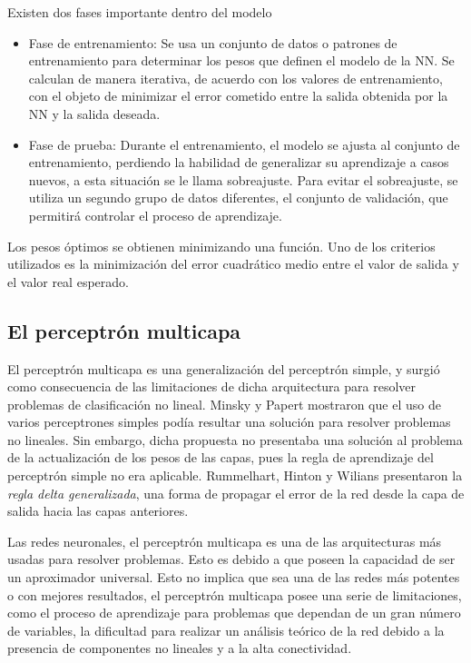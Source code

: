 Existen dos fases importante dentro del modelo
\begin{itemize}
	\item Fase de entrenamiento: Se usa un conjunto de datos o patrones de entrenamiento para determinar los pesos que definen el modelo de la NN. Se calculan de manera iterativa, de acuerdo con los valores de entrenamiento, con el objeto de minimizar el error cometido entre la salida obtenida por la NN y la salida deseada.

	\item Fase de prueba: Durante el entrenamiento, el modelo se ajusta al conjunto de entrenamiento, perdiendo la habilidad de generalizar su aprendizaje a casos nuevos, a esta situación se le llama sobreajuste.
	Para evitar el sobreajuste, se utiliza un segundo grupo de datos diferentes, el conjunto de validación, que permitirá controlar el proceso de aprendizaje.
\end{itemize}
Los pesos óptimos se obtienen minimizando una función. Uno de los criterios utilizados es la minimización del error cuadrático medio entre el valor de salida y el valor real esperado.









\subsection{El perceptrón multicapa}
El perceptrón multicapa es una generalización del perceptrón simple, y surgió como consecuencia de las limitaciones de dicha arquitectura para resolver problemas de clasificación no lineal. Minsky y Papert \cite{Newell1969b} mostraron que el uso de varios perceptrones simples podía resultar una solución para resolver problemas no lineales. Sin embargo, dicha propuesta no presentaba una solución al problema de la actualización de los pesos de las capas, pues la regla de aprendizaje del perceptrón simple no era aplicable. Rummelhart, Hinton y Wilians presentaron la {\em regla delta generalizada}, una forma de propagar el error de la red desde la capa de salida hacia las capas anteriores.

Las redes neuronales, el perceptrón multicapa es una de las arquitecturas más usadas para resolver problemas. Esto es debido a que poseen la capacidad de ser un aproximador universal. Esto no implica que sea una de las redes más potentes o con mejores resultados, el perceptrón multicapa posee una serie de limitaciones, como el proceso de aprendizaje para problemas que dependan de un gran número de variables, la dificultad para realizar un análisis teórico de la red debido a la presencia de componentes no lineales y a la alta conectividad.

